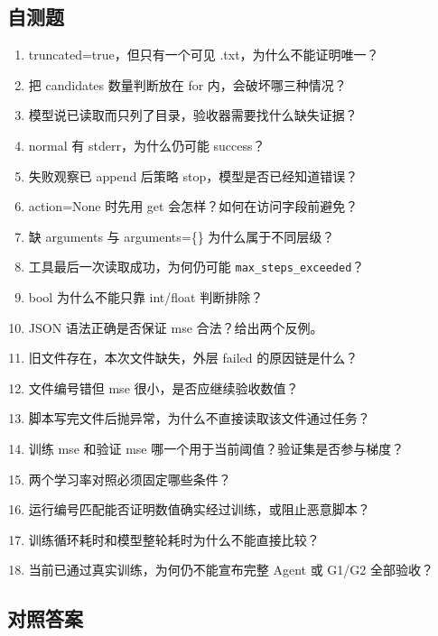\documentclass[UTF8,zihao=-4,fontset=fandol]{ctexart}
\begin{document}
\subsection{自测题}

\begin{enumerate}
\item truncated=true，但只有一个可见 .txt，为什么不能证明唯一？
\item 把 candidates 数量判断放在 for 内，会破坏哪三种情况？
\item 模型说已读取而只列了目录，验收器需要找什么缺失证据？
\item normal 有 stderr，为什么仍可能 success？
\item 失败观察已 append 后策略 stop，模型是否已经知道错误？
\item action=None 时先用 get 会怎样？如何在访问字段前避免？
\item 缺 arguments 与 arguments=\{\} 为什么属于不同层级？
\item 工具最后一次读取成功，为何仍可能 \nolinkurl{max_steps_exceeded}？
\item bool 为什么不能只靠 int/float 判断排除？
\item JSON 语法正确是否保证 mse 合法？给出两个反例。
\item 旧文件存在，本次文件缺失，外层 failed 的原因链是什么？
\item 文件编号错但 mse 很小，是否应继续验收数值？
\item 脚本写完文件后抛异常，为什么不直接读取该文件通过任务？
\item 训练 mse 和验证 mse 哪一个用于当前阈值？验证集是否参与梯度？
\item 两个学习率对照必须固定哪些条件？
\item 运行编号匹配能否证明数值确实经过训练，或阻止恶意脚本？
\item 训练循环耗时和模型整轮耗时为什么不能直接比较？
\item 当前已通过真实训练，为何仍不能宣布完整 Agent 或 G1/G2 全部验收？
\end{enumerate}

\subsection{对照答案}
\end{document}
